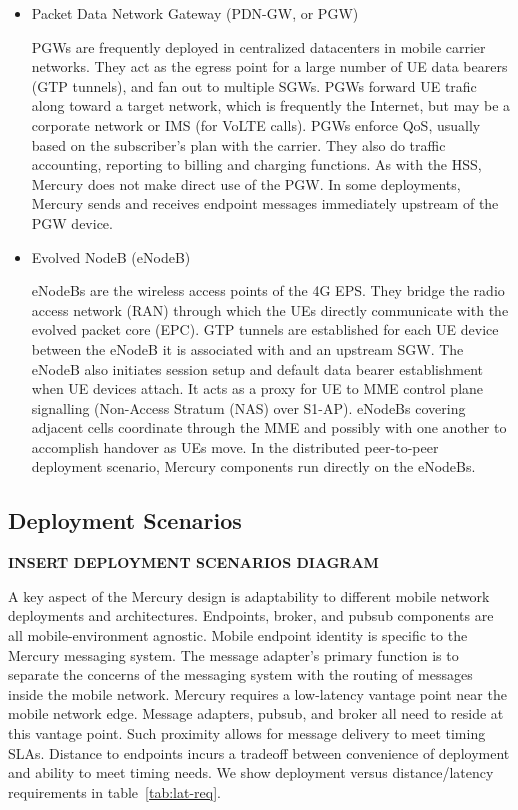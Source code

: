 \begin{itemize}
\item Packet Data Network Gateway (PDN-GW, or PGW)

PGWs are frequently deployed in centralized datacenters in mobile
carrier networks.  They act as the egress point for a large number of
UE data bearers (GTP tunnels), and fan out to multiple SGWs. PGWs
forward UE trafic along toward a target network, which is frequently
the Internet, but may be a corporate network or IMS (for VoLTE
calls). PGWs enforce QoS, usually based on the subscriber's plan with
the carrier. They also do traffic accounting, reporting to billing and
charging functions. As with the HSS, Mercury does not make direct use
of the PGW. In some deployments, Mercury sends and receives endpoint
messages immediately upstream of the PGW device.

\item Evolved NodeB (eNodeB)

eNodeBs are the wireless access points of the 4G EPS. They bridge the
radio access network (RAN) through which the UEs directly communicate
with the evolved packet core (EPC). GTP tunnels are established for
each UE device between the eNodeB it is associated with and an
upstream SGW.  The eNodeB also initiates session setup and default
data bearer establishment when UE devices attach. It acts as a proxy
for UE to MME control plane signalling (Non-Access Stratum (NAS) over
S1-AP). eNodeBs covering adjacent cells coordinate through the MME and
possibly with one another to accomplish handover as UEs move. In the
distributed peer-to-peer deployment scenario, Mercury components run
directly on the eNodeBs.

\end{itemize}

\subsection{Deployment Scenarios}

{\bf INSERT DEPLOYMENT SCENARIOS DIAGRAM}

A key aspect of the Mercury design is adaptability to different mobile
network deployments and architectures. Endpoints, broker, and pubsub
components are all mobile-environment agnostic. Mobile endpoint
identity is specific to the Mercury messaging system. The message
adapter's primary function is to separate the concerns of the
messaging system with the routing of messages inside the mobile
network.  Mercury requires a low-latency vantage point near the mobile
network edge. Message adapters, pubsub, and broker all need to reside
at this vantage point.  Such proximity allows for message delivery to
meet timing SLAs.  Distance to endpoints incurs a tradeoff between
convenience of deployment and ability to meet timing needs. We show
deployment versus distance/latency requirements in
table~\ref{tab:lat-req}.

